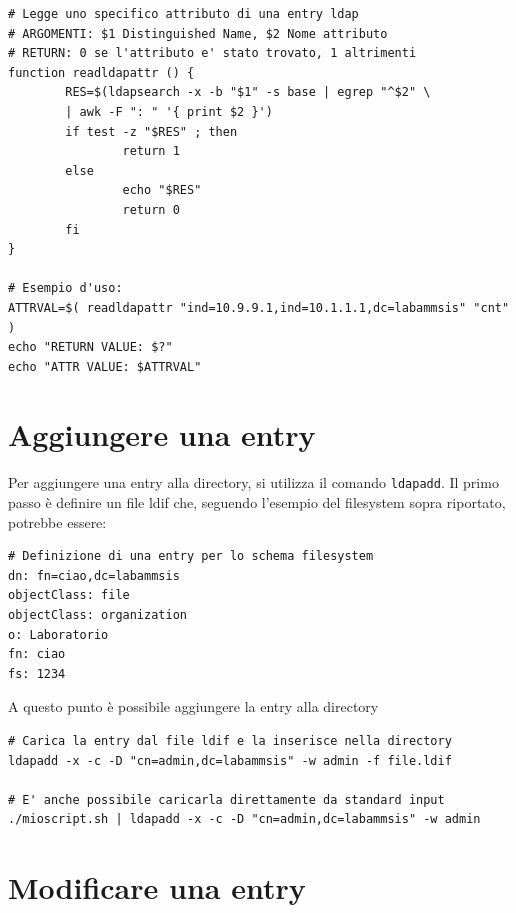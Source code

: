 \documentclass[a4paper]{report}
\newenvironment{funzioni}{\begin{tcolorbox}[fonttitle=\sffamily\bfseries\large,title=Funzioni Utili,colframe=darkgreen!75!white]}{\end{tcolorbox}}
\newenvironment{code}{\begin{tcolorbox}[size=small]}{\end{tcolorbox}}
\begin{document}
\begin{funzioni}
\begin{lstlisting}
# Legge uno specifico attributo di una entry ldap
# ARGOMENTI: $1 Distinguished Name, $2 Nome attributo
# RETURN: 0 se l'attributo e' stato trovato, 1 altrimenti
function readldapattr () {
        RES=$(ldapsearch -x -b "$1" -s base | egrep "^$2" \
        | awk -F ": " '{ print $2 }')
        if test -z "$RES" ; then
                return 1
        else
                echo "$RES"
                return 0
        fi
}

# Esempio d'uso:
ATTRVAL=$( readldapattr "ind=10.9.9.1,ind=10.1.1.1,dc=labammsis" "cnt" )
echo "RETURN VALUE: $?"
echo "ATTR VALUE: $ATTRVAL"
\end{lstlisting}
\end{funzioni}


\section{Aggiungere una entry}

Per aggiungere una entry alla directory, si utilizza il comando \texttt{ldapadd}. Il primo passo è definire un file ldif che, seguendo l'esempio del filesystem sopra riportato, potrebbe essere:

\begin{code}
\begin{lstlisting}
# Definizione di una entry per lo schema filesystem
dn: fn=ciao,dc=labammsis
objectClass: file
objectClass: organization
o: Laboratorio
fn: ciao
fs: 1234
\end{lstlisting}
\end{code}

A questo punto è possibile aggiungere la entry alla directory

\begin{code}
\begin{lstlisting}
# Carica la entry dal file ldif e la inserisce nella directory
ldapadd -x -c -D "cn=admin,dc=labammsis" -w admin -f file.ldif

# E' anche possibile caricarla direttamente da standard input
./mioscript.sh | ldapadd -x -c -D "cn=admin,dc=labammsis" -w admin
\end{lstlisting}
\end{code}

\section{Modificare una entry}
\end{document}
